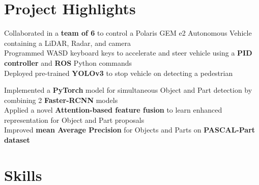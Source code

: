 \documentclass[]{Keval-resume}
\begin{document}
\section{Project Highlights}
\hrulefill
\postsectionsep




\textbullet{} Collaborated in a \textbf{team of 6} to control a Polaris GEM e2 Autonomous Vehicle containing a LiDAR, Radar, and camera \\
\textbullet{} Programmed WASD keyboard keys to accelerate and steer vehicle using a \textbf{PID controller} and \textbf{ROS} Python commands \\
\textbullet{} Deployed pre-trained \textbf{YOLOv3} to stop vehicle on detecting a pedestrian
\sectionsep


\textbullet{} Implemented a \textbf{PyTorch} model for simultaneous Object and Part detection by combining 2 \textbf{Faster-RCNN} models \\
\textbullet{} Applied a novel \textbf{Attention-based feature fusion} to learn enhanced representation for Object and Part proposals \\
\textbullet{} Improved \textbf{mean Average Precision} for Objects and Parts on \textbf{PASCAL-Part dataset}
\sectionsep

\section{Skills} 
\hrulefill
\postsectionsep
\end{document}
